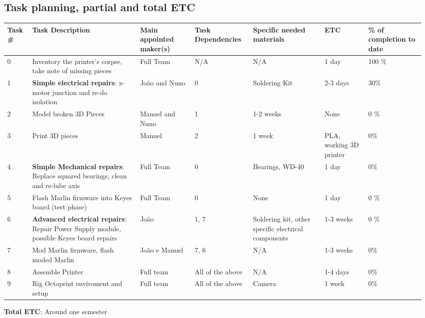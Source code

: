 \documentclass[a4paper,12pt]{article}
\begin{document}
			\subsection{Task planning, partial and total ETC}
		\begin{center}		
		\begin{longtable}[H]{||p{2cm}|p{2cm}|p{2cm}|p{2cm}|p{2cm}|p{2cm}|p{2cm}||}
				\hline
				Task \# & Task Description & Main appointed maker(s) & Task Dependencies & Specific needed materials & ETC & \% of completion to date \\ \hline
				0 & Inventory the printer's corpse, take note of missing pieces & Full Team & N/A & N/A & 1 day & 100 \% \\ \hline
				1 & \textbf{Simple electrical repairs}: x-motor junction  and re-do isolation & João and Nuno & 0 & Soldering Kit & 2-3 days & 30\% \\ \hline
				2 & Model broken 3D Pieces & Manuel and Nuno & 1 & 1-2 weeks & None & 0 \% \\ \hline
				3 & Print 3D pieces & Manuel & 2 & 1 week & PLA, working 3D printer & 0\% \\ \hline
				4 & \textbf{Simple Mechanical repairs}:  Replace squared bearings, clean and re-lube axis & Full Team & 0 & Bearings, WD-40 & 1 day & 0\% \\ \hline
				5 & Flash Marlin firmware into Keyes board (test phase) & Full Team & 0 & None & 1 day & 0 \% \\ \hline
				6 & \textbf{Advanced electrical repairs}:  Repair Power Supply module, possible Keyes board repairs & João & 1, 7 & Soldering kit, other specific electrical components & 1-3 weeks & 0 \%  \\ \hline
				
				7 & Mod Marlin firmware, flash moded Marlin & João e Manuel & 7, 6  & N/A & 1-3 weeks & 0\% \\ \hline
				8 & Assemble Printer & Full team & All of the above & N/A & 1-4 days & 0\% \\ \hline
				9 & Rig Octoprint enviroment and setup & Full team & All of the above & Camera & 1 week & 0\% \\ \hline
			

		\end{longtable}
		\end{center}
		\textbf{Total ETC}: Around one semester  %
\end{document}
